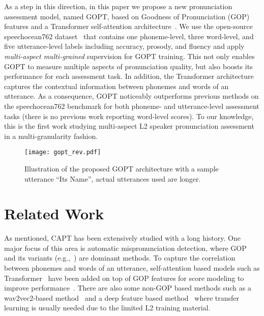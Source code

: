 \documentclass{article}
\newcommand{\squeezeup}{\vspace{-1.6mm}}
\begin{document}
As a step in this direction, in this paper we propose a new pronunciation assessment model, named GOPT, based on Goodness of Pronunciation (GOP) features and a Transformer self-attention architecture~\cite{vaswani2017attention}. We use the open-source speechocean762 dataset~\cite{zhang2021speechocean762} that contains one phoneme-level, three word-level, and five utterance-level labels including accuracy, prosody, and fluency and apply \emph{multi-aspect multi-grained} supervision for GOPT training. This not only enables GOPT to measure multiple aspects of pronunciation quality, but also boosts its performance for each assessment task. In addition, the Transformer architecture captures the contextual information between phonemes and words of an utterance. As a consequence, GOPT noticeably outperforms previous methods on the speechocean762 benchmark for both phoneme- and utterance-level assessment tasks (there is no previous work reporting word-level scores). To our knowledge, this is the first work studying multi-aspect L2 speaker pronunciation assessment in a multi-granularity fashion. 

\begin{figure*}[t]
  \texttt{[image: gopt\_rev.pdf]}
  \caption{Illustration of the proposed GOPT architecture with a sample utterance ``Its Name'', actual utterances used are longer.}
  \label{fig:arc}
  \squeezeup\squeezeup
\end{figure*}

\squeezeup\squeezeup
\section{Related Work}
\squeezeup

As mentioned, CAPT has been extensively studied with a long history. One major focus of this area is automatic mispronunciation detection, where GOP~\cite{Witt2000GOP} and its variants (e.g.,~\cite{van2010using,zhang2008automatic,wang2012improved,hu2015improved}) are dominant methods. To capture the correlation between phonemes and words of an utterance, self-attention based models such as Transformer~\cite{vaswani2017attention} have been added on top of GOP features for score modeling to improve performance~\cite{Shi2020ContextawareGOP,lin2020automatic}. There are also some non-GOP based methods such as a wav2vec2-based method~\cite{xu2021explore} and a deep feature based method~\cite{lin2021deep} where transfer learning is usually needed due to the limited L2 training material.
\end{document}
